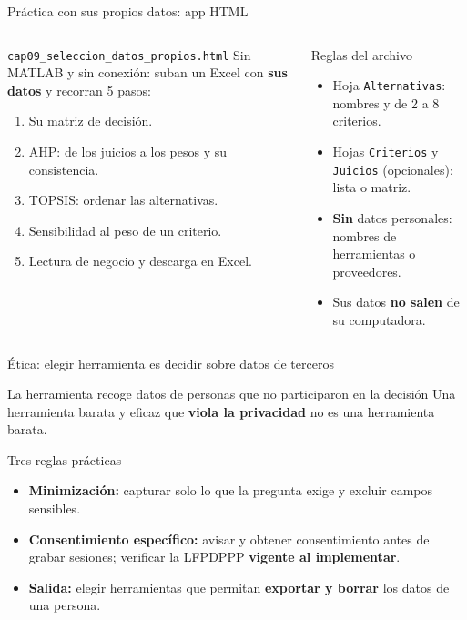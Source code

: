 \documentclass[aspectratio=169,xcolor=dvipsnames]{beamer}
\begin{document}
\begin{frame}{Práctica con sus propios datos: app HTML}
\begin{columns}[T]
  \begin{block}{\texttt{cap09\_seleccion\_datos\_propios.html}}
    \small Sin MATLAB y sin conexión: suban un Excel con \textbf{sus datos} y recorran 5 pasos:
    \scriptsize
    \begin{enumerate}
      \item Su matriz de decisión.
      \item AHP: de los juicios a los pesos y su consistencia.
      \item TOPSIS: ordenar las alternativas.
      \item Sensibilidad al peso de un criterio.
      \item Lectura de negocio y descarga en Excel.
    \end{enumerate}
  \end{block}
  \begin{exampleblock}{Reglas del archivo}
    \scriptsize
    \begin{itemize}
      \item Hoja \texttt{Alternativas}: nombres y de 2 a 8 criterios.
      \item Hojas \texttt{Criterios} y \texttt{Juicios} (opcionales): lista o matriz.
      \item \textbf{Sin} datos personales: nombres de herramientas o proveedores.
      \item Sus datos \textbf{no salen} de su computadora.
    \end{itemize}
  \end{exampleblock}
\end{columns}
\end{frame}

\begin{frame}{Ética: elegir herramienta es decidir sobre datos de terceros}
\begin{alertblock}{La herramienta recoge datos de personas que no participaron en la decisión}
  Una herramienta barata y eficaz que \textbf{viola la privacidad} no es una herramienta barata.
\end{alertblock}
\begin{block}{Tres reglas prácticas}
  \begin{itemize}
    \item \textbf{Minimización:} capturar solo lo que la pregunta exige y excluir campos sensibles.
    \item \textbf{Consentimiento específico:} avisar y obtener consentimiento antes de grabar sesiones; verificar la LFPDPPP \textbf{vigente al implementar}.
    \item \textbf{Salida:} elegir herramientas que permitan \textbf{exportar y borrar} los datos de una persona.
  \end{itemize}
\end{block}
\end{frame}
\end{document}
